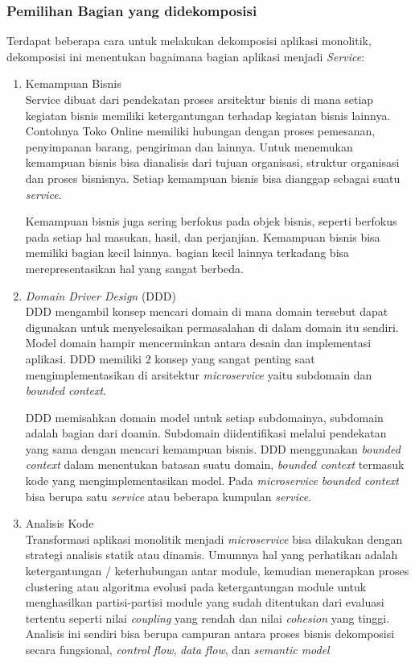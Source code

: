\subsubsection{Pemilihan Bagian yang didekomposisi}
Terdapat beberapa cara untuk melakukan dekomposisi aplikasi monolitik, dekomposisi ini menentukan bagaimana bagian aplikasi menjadi \textit{Service}:
\begin{enumerate}[leftmargin=1.3cm]
	\item Kemampuan Bisnis\cite{1C7}\\
		 Service dibuat dari pendekatan proses arsitektur bisnis di mana setiap kegiatan bisnis memiliki ketergantungan terhadap kegiatan bisnis lainnya. Contohnya Toko Online memiliki hubungan dengan proses pemesanan, penyimpanan barang, pengiriman dan lainnya. Untuk menemukan kemampuan bisnis bisa dianalisis dari tujuan organisasi, struktur organisasi dan proses bisnisnya. Setiap kemampuan bisnis bisa dianggap sebagai suatu \textit{service}.

		 Kemampuan bisnis juga sering berfokus pada objek bisnis, seperti berfokus pada  setiap hal masukan, hasil, dan perjanjian. Kemampuan bisnis bisa memiliki bagian kecil lainnya. bagian kecil lainnya terkadang bisa merepresentasikan hal yang sangat berbeda.
	\item \textit{Domain Driver Design} (DDD) \cite{1C7} \\
		DDD mengambil konsep mencari domain di mana domain tersebut dapat digunakan untuk menyelesaikan permasalahan di dalam domain itu sendiri. Model domain hampir mencerminkan antara desain dan implementasi aplikasi. DDD memiliki 2 konsep yang sangat penting saat mengimplementasikan di arsitektur \textit{microservice} yaitu subdomain dan \textit{bounded context}.

		DDD memisahkan domain model untuk setiap subdomainya, subdomain adalah bagian dari doamin. Subdomain diidentifikasi melalui pendekatan yang sama dengan mencari kemampuan bisnis. DDD menggunakan \textit{bounded context} dalam menentukan batasan suatu domain, \textit{bounded context} termasuk kode yang mengimplementasikan model. Pada \textit{microservice} \textit{bounded context} bisa berupa satu \textit{service} atau beberapa kumpulan \textit{service}.
	\item Analisis Kode \cite{74C,5B1}  \\
		Transformasi aplikasi monolitik menjadi \textit{microservice} bisa dilakukan dengan strategi analisis statik atau dinamis. Umumnya hal yang perhatikan adalah ketergantungan / keterhubungan antar module, kemudian menerapkan proses clustering atau algoritma evolusi pada ketergantungan module untuk menghasilkan partisi-partisi module yang sudah ditentukan dari evaluasi tertentu seperti nilai \textit{coupling} yang rendah dan nilai \textit{cohesion} yang tinggi. Analisis ini sendiri bisa berupa campuran antara proses bisnis dekomposisi secara fungsional, \textit{control flow}, \textit{data flow}, dan \textit{semantic model}
		
\end{enumerate}	

